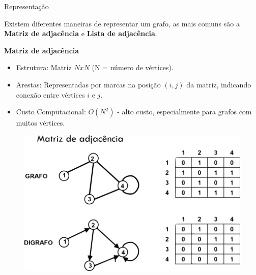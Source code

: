 \documentclass{if-beamer}
\begin{document}
\begin{frame}{Representação} 

\justifying
Existem diferentes maneiras de representar um grafo, as mais comuns são a \textbf{Matriz de adjacência} e \textbf{Lista de adjacência}.\pause

\textbf{Matriz de adjacência}
\begin{itemize}
\item  Estrutura: Matriz $NxN$ (N = número de vértices).
\item  Arestas: Representadas por marcas na posição $(i, j)$ da matriz, indicando conexão entre vértices $i$ e $j$.
\item  Custo Computacional: $O(N^2)$ - alto custo, especialmente para grafos com muitos vértices.
\end{itemize} 

\begin{figure}
  \centering
  \includegraphics[scale=0.70]{Figuras/exemplos-grafo/q.png}
\end{figure}
\end{frame}
\end{document}
